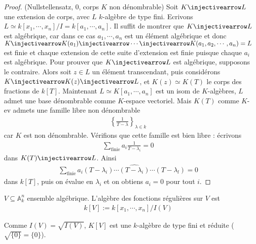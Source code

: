         \begin{proof} (Nullstellensatz, 0, corps $K$ non dénombrable)
            Soit $K \injectivearrow L$ une extension de corps, avec $L$ $k$-algèbre de type fini. Ecrivons $L \simeq k[x_1, \cdots, x_n] / I = k[a_1, \cdots, a_n]$. Il suffit de montrer que $K \injectivearrow L$ est algébrique, car dans ce cas $a_1, \cdots, a_n$ est un élément algébrique et donc $K \injectivearrow K(a_1) \injectivearrow \cdots \injectivearrow K(a_1, a_2, \cdots, a_n) = L$ est finie et chaque extension de cette suite d'extension est finie puisque chaque $a_i$ est algébrique. Pour prouver que $K \injectivearrow L$ est algébrique, supposons le contraire. Alors soit $z \in L$ un élément transcendant, puis considérons $K \injectivearrow K(z) \injectivearrow L$, et $K(z) \simeq K(T)$ le corps des fractions de $k[T]$. Maintenant $L \simeq K[a_1, \cdots, a_n]$ est un isom de $K$-algèbres, $L$ admet une base dénombrable comme $K$-espace vectoriel. Mais $K(T)$ comme $K$-ev admets une famille libre non dénombrable
            \begin{align*}
                \left\{ \frac{1}{T - \lambda} \right\}_{\lambda \in k}
            \end{align*}
            car $K$ est non dénombrable. Vérifions que cette famille est bien libre : écrivons
            \begin{align*}
                \sum_{\mathrm{finie}} a_i \frac{1}{T - \lambda_i} = 0
            \end{align*}
            dans $K(T) \injectivearrow L$. Ainsi
            \begin{align*}
                \sum_{\mathrm{finie}} a_i (T - \lambda_i) \cdots \widehat{(T - \lambda_i)} \cdots (T - \lambda_l) = 0
            \end{align*}
            dans $k[T]$, puis on évalue en $\lambda_i$ et on obtiens $a_i = 0$ pour tout $i$.
        \end{proof}
        \begin{defi}
            $V \subseteq \mathbb{A}_k^n$ ensemble algébrique. L'algèbre des fonctions régulières sur $V$ est
            \begin{align*}
                k[V] := k[x_1, \cdots, x_n]/I(V)
            \end{align*}
        \end{defi}
        \begin{remq}
            Comme $I(V) = \sqrt{I(V)}$, $K[V]$ est une $k$-algèbre de type fini et réduite ($\sqrt{\{0\}} = \{0\}$).
        \end{remq}
